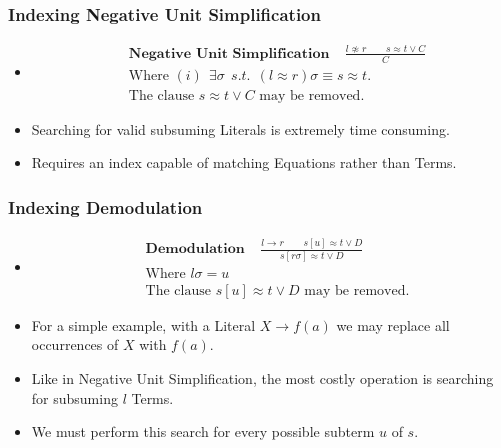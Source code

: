 \documentclass[10pt,xcolor={dvipsnames}]{beamer}
\begin{document}
\begin{NoHyper}
\begin{frame}
  \frametitle{Indexing Negative Unit Simplification}
  \begin{itemize}
  \item<1->[] 
\begin{align*}
&\textbf{Negative Unit Simplification}\ \ \ \ \ \frac{l\not\approx r \quad \quad s \approx t  \lor C}{C}\\
&\text{Where } (i)\ \  \exists \sigma\ \  s.t.\ \  (l \approx r)\sigma \equiv s \approx t.\\
&\text{The clause $s \approx t  \lor C$ may be removed.}
\end{align*}
  \item<2-> Searching for valid subsuming Literals is extremely time consuming.
  \item<2-> Requires an index capable of matching Equations rather than Terms.
  \end{itemize}
\end{frame}

\begin{frame}
  \frametitle{Indexing Demodulation}
  \begin{itemize}
  \item<1->[] 
\begin{align*}
&\textbf{Demodulation}\ \ \ \ \ \frac{l \to r \quad \quad s[u] \approx t  \lor D}{ s[r\sigma] \approx t \lor D}\\
&\text{Where } l\sigma = u\\
&\text{The clause $s[u] \approx t  \lor D$ may be removed.}
\end{align*}
  \item<2-> For a simple example, with a Literal $X \to f(a)$ we may replace all occurrences of $X$ with $f(a)$.
  \item<3-> Like in Negative Unit Simplification, the most costly operation is searching
  for subsuming $l$ Terms.
  \item<3-> We must perform this search for every possible subterm $u$ of $s$.
  \end{itemize}
\end{frame}


\end{NoHyper}
\end{document}
